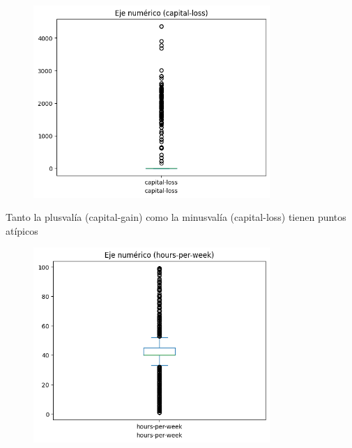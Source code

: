 \documentclass{article}
\begin{document}
	\begin{figure}[H]
		\centering
		\includegraphics[width=0.8\textwidth]{capital-loss.png}  
	\end{figure}
	Tanto la plusvalía (capital-gain) como la minusvalía (capital-loss) tienen puntos atípicos
	\begin{figure}[H]
		\centering
		\includegraphics[width=0.8\textwidth]{hours-per-week.png}  
	\end{figure}
	
\end{document}
